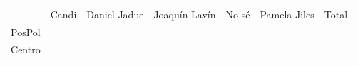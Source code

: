 \documentclass[
]{article}
\begin{document}
\begin{longtable}[]{@{}rrrrrrr@{}}
\toprule
\endhead
\begin{minipage}[t]{0.17\columnwidth}\raggedleft
\strut
\end{minipage} & \begin{minipage}[t]{0.05\columnwidth}\raggedleft
Candi\strut
\end{minipage} & \begin{minipage}[t]{0.12\columnwidth}\raggedleft
Daniel Jadue\strut
\end{minipage} & \begin{minipage}[t]{0.11\columnwidth}\raggedleft
Joaquín Lavín\strut
\end{minipage} & \begin{minipage}[t]{0.12\columnwidth}\raggedleft
No sé\strut
\end{minipage} & \begin{minipage}[t]{0.12\columnwidth}\raggedleft
Pamela Jiles\strut
\end{minipage} & \begin{minipage}[t]{0.12\columnwidth}\raggedleft
Total\strut
\end{minipage}\tabularnewline
\begin{minipage}[t]{0.17\columnwidth}\raggedleft
PosPol\strut
\end{minipage} & \begin{minipage}[t]{0.05\columnwidth}\raggedleft
\strut
\end{minipage} & \begin{minipage}[t]{0.12\columnwidth}\raggedleft
\strut
\end{minipage} & \begin{minipage}[t]{0.11\columnwidth}\raggedleft
\strut
\end{minipage} & \begin{minipage}[t]{0.12\columnwidth}\raggedleft
\strut
\end{minipage} & \begin{minipage}[t]{0.12\columnwidth}\raggedleft
\strut
\end{minipage} & \begin{minipage}[t]{0.12\columnwidth}\raggedleft
\strut
\end{minipage}\tabularnewline
\begin{minipage}[t]{0.17\columnwidth}\raggedleft
Centro\strut
\end{minipage} & \begin{minipage}[t]{0.05\columnwidth}\raggedleft
\strut
\end{minipage} & \begin{minipage}[t]{0.12\columnwidth}\raggedleft

\end{minipage}
\end{longtable}
\end{document}
